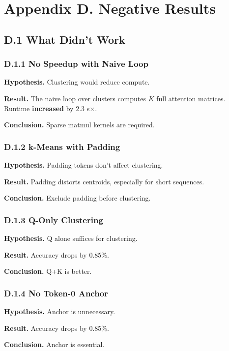 
\section{Appendix D. Negative Results}

\subsection{D.1 What Didn't Work}

\subsubsection{D.1.1 No Speedup with Naive Loop}

\textbf{Hypothesis.} Clustering would reduce compute.

\textbf{Result.} The naive loop over clusters computes $K$ full attention 
matrices. Runtime \textbf{increased} by 2.3 s$\times$.

\textbf{Conclusion.} Sparse matmul kernels are required.

\subsubsection{D.1.2 k-Means with Padding}

\textbf{Hypothesis.} Padding tokens don't affect clustering.

\textbf{Result.} Padding distorts centroids, especially for short sequences.

\textbf{Conclusion.} Exclude padding before clustering.

\subsubsection{D.1.3 Q-Only Clustering}

\textbf{Hypothesis.} Q alone suffices for clustering.

\textbf{Result.} Accuracy drops by 0.85\%.

\textbf{Conclusion.} Q+K is better.

\subsubsection{D.1.4 No Token-0 Anchor}

\textbf{Hypothesis.} Anchor is unnecessary.

\textbf{Result.} Accuracy drops by 0.85\%.

\textbf{Conclusion.} Anchor is essential.

